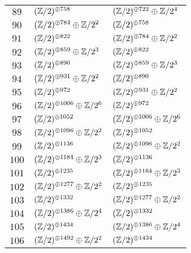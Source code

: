 \begin{supertabular}{|c|p{5.5cm}|p{5.5cm}|}
$89$%
&$(\mathbb{Z}/2)^{\oplus758}$%
&$(\mathbb{Z}/2)^{\oplus722}\oplus\mathbb{Z}/2^{4}$\\

$90$%
&$(\mathbb{Z}/2)^{\oplus784}\oplus\mathbb{Z}/2^{2}$%
&$(\mathbb{Z}/2)^{\oplus758}$\\

$91$%
&$(\mathbb{Z}/2)^{\oplus822}$%
&$(\mathbb{Z}/2)^{\oplus784}\oplus\mathbb{Z}/2^{2}$\\

$92$%
&$(\mathbb{Z}/2)^{\oplus859}\oplus\mathbb{Z}/2^{3}$%
&$(\mathbb{Z}/2)^{\oplus822}$\\

$93$%
&$(\mathbb{Z}/2)^{\oplus890}$%
&$(\mathbb{Z}/2)^{\oplus859}\oplus\mathbb{Z}/2^{3}$\\

$94$%
&$(\mathbb{Z}/2)^{\oplus931}\oplus\mathbb{Z}/2^{2}$%
&$(\mathbb{Z}/2)^{\oplus890}$\\

$95$%
&$(\mathbb{Z}/2)^{\oplus972}$%
&$(\mathbb{Z}/2)^{\oplus931}\oplus\mathbb{Z}/2^{2}$\\

$96$%
&$(\mathbb{Z}/2)^{\oplus1006}\oplus\mathbb{Z}/2^{6}$%
&$(\mathbb{Z}/2)^{\oplus972}$\\

$97$%
&$(\mathbb{Z}/2)^{\oplus1052}$%
&$(\mathbb{Z}/2)^{\oplus1006}\oplus\mathbb{Z}/2^{6}$\\

$98$%
&$(\mathbb{Z}/2)^{\oplus1096}\oplus\mathbb{Z}/2^{2}$%
&$(\mathbb{Z}/2)^{\oplus1052}$\\

$99$%
&$(\mathbb{Z}/2)^{\oplus1136}$%
&$(\mathbb{Z}/2)^{\oplus1096}\oplus\mathbb{Z}/2^{2}$\\

$100$%
&$(\mathbb{Z}/2)^{\oplus1184}\oplus\mathbb{Z}/2^{3}$%
&$(\mathbb{Z}/2)^{\oplus1136}$\\

$101$%
&$(\mathbb{Z}/2)^{\oplus1235}$%
&$(\mathbb{Z}/2)^{\oplus1184}\oplus\mathbb{Z}/2^{3}$\\

$102$%
&$(\mathbb{Z}/2)^{\oplus1277}\oplus\mathbb{Z}/2^{2}$%
&$(\mathbb{Z}/2)^{\oplus1235}$\\

$103$%
&$(\mathbb{Z}/2)^{\oplus1332}$%
&$(\mathbb{Z}/2)^{\oplus1277}\oplus\mathbb{Z}/2^{2}$\\

$104$%
&$(\mathbb{Z}/2)^{\oplus1386}\oplus\mathbb{Z}/2^{4}$%
&$(\mathbb{Z}/2)^{\oplus1332}$\\

$105$%
&$(\mathbb{Z}/2)^{\oplus1434}$%
&$(\mathbb{Z}/2)^{\oplus1386}\oplus\mathbb{Z}/2^{4}$\\

$106$%
&$(\mathbb{Z}/2)^{\oplus1492}\oplus\mathbb{Z}/2^{2}$%
&$(\mathbb{Z}/2)^{\oplus1434}$\\


\end{supertabular}
